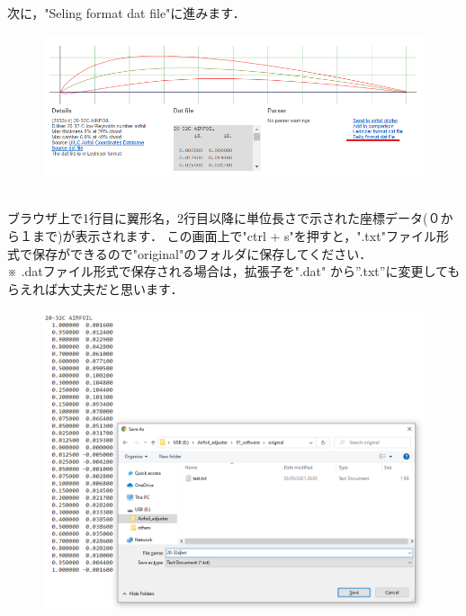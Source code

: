 \documentclass[12pt,a4paper]{jsarticle}
\begin{document}
\newpage
次に，"Seling format dat file"に進みます．
\begin{figure}[htbp]
    \begin{center}
        \includegraphics[width=120mm]{images/image_6.png}
    \end{center}
\end{figure} \\
ブラウザ上で1行目に翼形名，2行目以降に単位長さで示された座標データ(０から１まで)が表示されます．
この画面上で"ctrl + s"を押すと，".txt"ファイル形式で保存ができるので"original"のフォルダに保存してください．\\
※ .datファイル形式で保存される場合は，拡張子を".dat" から”.txt”に変更してもらえれば大丈夫だと思います．
\begin{figure}[htbp]
    \begin{center}
        \includegraphics[width=120mm]{images/image_7.png}
    \end{center}
\end{figure} \\
\newpage
\end{document}

